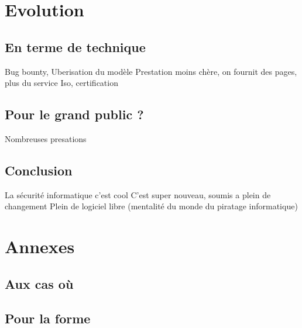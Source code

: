 \documentclass[a4paper]{memoir}
\begin{document}
\part{Evolution}

\chapter{En terme de technique}

Bug bounty, Uberisation du modèle
Prestation moins chère, on fournit des pages, plus du service
Iso, certification

\chapter{Pour le grand public ?}

Nombreuses presations


\chapter*{Conclusion}

La sécurité informatique c'est cool
C'est super nouveau, soumis a plein de changement
Plein de logiciel libre (mentalité du monde du piratage informatique)


\part*{Annexes}
\appendix

\chapter{Aux cas où}

\chapter{Pour la forme}


\backmatter%

\nocite{*}



\printindex
\end{document}

